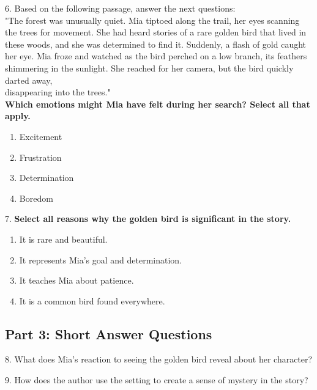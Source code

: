 \documentclass[12pt]{article}
\begin{document}
\vspace{1cm}

6. Based on the following passage, answer the next questions:\\
"The forest was unusually quiet. Mia tiptoed along the trail, her eyes scanning the trees for movement. She had heard stories of a rare golden bird that lived in these woods, and she was determined to find it. Suddenly, a flash of gold caught her eye. Mia froze and watched as the bird perched on a low branch, its feathers shimmering in the sunlight. She reached for her camera, but the bird quickly darted away, \\disappearing into the trees."\\
\textbf{Which emotions might Mia have felt during her search? Select all that apply.}\\
\begin{enumerate}[label=\Alph*.]
    \item Excitement  
    \item Frustration  
    \item Determination  
    \item Boredom  
\end{enumerate}

\vspace{1cm}

7. \textbf{Select all reasons why the golden bird is significant in the story.}\\
\begin{enumerate}[label=\Alph*.]
    \item It is rare and beautiful.  
    \item It represents Mia’s goal and determination.  
    \item It teaches Mia about patience.  
    \item It is a common bird found everywhere.  
\end{enumerate}

\vspace{1cm}
\newpage
\subsection*{Part 3: Short Answer Questions}

8. What does Mia’s reaction to seeing the golden bird reveal about her character?\\
\vspace{4cm}



9. How does the author use the setting to create a sense of mystery in the story?\\
\vspace{4cm}
\end{document}
